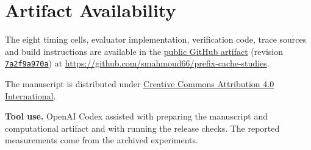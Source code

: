 \documentclass[11pt,letterpaper]{article}
\begin{document}
\section*{Artifact Availability}

The eight timing cells, evaluator implementation, verification code, trace sources and build instructions are available in the \href{https://github.com/smahmoud66/prefix-cache-studies/blob/7a2f9a970a0bb851a5517bf48c3c95dd73cb538b/docs/evaluator.md}{public GitHub artifact} (revision \href{https://github.com/smahmoud66/prefix-cache-studies/commit/7a2f9a970a0bb851a5517bf48c3c95dd73cb538b}{\texttt{7a2f9a970a}}) at \url{https://github.com/smahmoud66/prefix-cache-studies}.

The manuscript is distributed under \href{https://creativecommons.org/licenses/by/4.0/}{Creative Commons Attribution 4.0 International}.

\noindent\textbf{Tool use.} OpenAI Codex assisted with preparing the manuscript and computational artifact and with running the release checks. The reported measurements come from the archived experiments.
\end{document}
